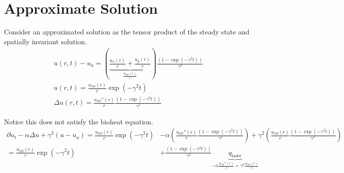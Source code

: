 \documentclass{article}         %
\theoremstyle{definition}
\theoremstyle{remark}
\begin{document}
\section{Approximate Solution}

Consider an approximated solution as the tensor product of the steady state
and spatially invariant solution.
\begin{equation} \label{AssumedAnalyticForm}
\begin{split}
 u(r,t) - u_a = 
 \left(
 \underbrace{
 \frac{u_h(r)}{r} +
 \frac{u_p(r)}{r}
  }_{
 \frac{u_{SS}(r)}{r}
  }
 \right)
 \frac{\left( 1 - \exp(-\gamma^2 t)\right)}{ \gamma^2}  
\\
 \dot{u}(r,t)  =  
 \frac{u_{SS}(r)}{r}  \exp(-\gamma^2 t)
\\
 \Delta u(r,t)  = 
 \frac{u_{SS}''(r)}{r} 
 \frac{\left( 1 - \exp(-\gamma^2 t)\right)}{ \gamma^2}  
\end{split}
\end{equation}

Notice this does not satisfy the bioheat equation.
\[
\begin{split}
  \partial u_t   
 - \alpha \Delta u   
 +  \gamma^2 (u  - u_a )
  = 
  \frac{u_{SS}(r)}{r}  \exp(-\gamma^2 t)
 & - 
  \alpha
  \left(
 \frac{u_{SS}''(r)}{r} 
 \frac{\left( 1 - \exp(-\gamma^2 t)\right)}{ \gamma^2}  
  \right)
  + 
  \gamma^2
  \left(
  \frac{u_{SS}(r)}{r} 
 \frac{\left( 1 - \exp(-\gamma^2 t)\right)}{ \gamma^2}  
  \right)
\\
  = 
   \frac{u_{SS}(r)}{r}  \exp(-\gamma^2 t)
 &+
 \frac{\left( 1 - \exp(-\gamma^2 t)\right)}{ \gamma^2}  
 \underbrace{q_\text{laser}}_{
  -\alpha \frac{u_{SS}''(r)}{r} 
  + \gamma^2
  \frac{u_{SS}(r)}{r} 
  }
\end{split}
\]
\end{document}
